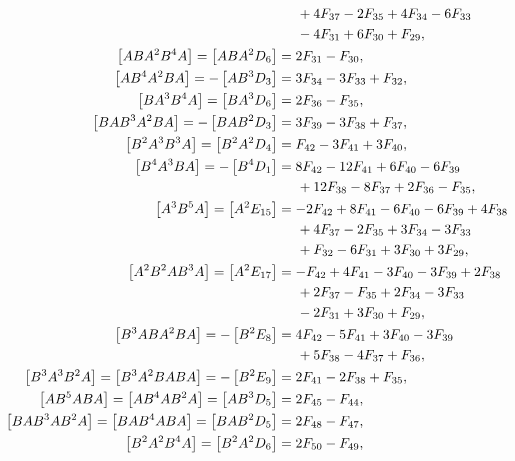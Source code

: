 \documentclass[12pt]{article}
\begin{document}
\begin{equation}
\begin{aligned}
    &\hspace{0.5cm} + 4 F_{37} - 2 F_{35} + 4 F_{34} - 6 F_{33} \\
    &\hspace{0.5cm} - 4 F_{31} + 6 F_{30} + F_{29}, \\
    \left [ A B A^{2} B^{4} A \right ] = \left [ A B A^{2} D_{6} \right ] &= 2 F_{31} - F_{30}, \\
    \left [ A B^{4} A^{2} B A \right ] = - \left [ A B^{3} D_{3} \right ] &= 3 F_{34} - 3 F_{33} + F_{32}, \\
    \left [ B A^{3} B^{4} A \right ] = \left [ B A^{3} D_{6} \right ] &= 2 F_{36} - F_{35}, \\
    \left [ B A B^{3} A^{2} B A \right ] = - \left [ B A B^{2} D_{3} \right ] &= 3 F_{39} - 3 F_{38} + F_{37}, \\
    \left [ B^{2} A^{3} B^{3} A \right ] = \left [ B^{2} A^{2} D_{4} \right ] &= F_{42} - 3 F_{41} + 3 F_{40}, \\
    \left [ B^{4} A^{3} B A \right ] = - \left [ B^{4} D_{1} \right ] &= 8 F_{42} - 12 F_{41} + 6 F_{40} - 6 F_{39} \\
    &\hspace{0.5cm} + 12 F_{38} - 8 F_{37} + 2 F_{36} - F_{35}, \\
    \left [ A^{3} B^{5} A \right ] = \left [ A^{2} E_{15} \right ] &= - 2 F_{42} + 8 F_{41} - 6 F_{40} - 6 F_{39} + 4 F_{38} \\
    &\hspace{0.5cm} + 4 F_{37} - 2 F_{35} + 3 F_{34} - 3 F_{33} \\
    &\hspace{0.5cm} + F_{32} - 6 F_{31} + 3 F_{30} + 3 F_{29}, \\
    \left [ A^{2} B^{2} A B^{3} A \right ] = \left [ A^{2} E_{17} \right ] &= - F_{42} + 4 F_{41} - 3 F_{40} - 3 F_{39} + 2 F_{38} \\
    &\hspace{0.5cm} + 2 F_{37} - F_{35} + 2 F_{34} - 3 F_{33} \\
    &\hspace{0.5cm} - 2 F_{31} + 3 F_{30} + F_{29}, \\
    \left [ B^{3} A B A^{2} B A \right ] = - \left [ B^{2} E_{8} \right ] &= 4 F_{42} - 5 F_{41} + 3 F_{40} - 3 F_{39} \\
    &\hspace{0.5cm} + 5 F_{38} - 4 F_{37} + F_{36}, \\
    \left [ B^{3} A^{3} B^{2} A \right ] = \left [ B^{3} A^{2} B A B A \right ] = - \left [ B^{2} E_{9} \right ] &= 2 F_{41} - 2 F_{38} + F_{35}, \\
    \left [ A B^{5} A B A \right ] = \left [ A B^{4} A B^{2} A \right ] = \left [ A B^{3} D_{5} \right ] &= 2 F_{45} - F_{44}, \\
    \left [ B A B^{3} A B^{2} A \right ] = \left [ B A B^{4} A B A \right ] = \left [ B A B^{2} D_{5} \right ] &= 2 F_{48} - F_{47}, \\
    \left [ B^{2} A^{2} B^{4} A \right ] = \left [ B^{2} A^{2} D_{6} \right ] &= 2 F_{50} - F_{49},
  \end{aligned}
\end{equation}
\end{document}
